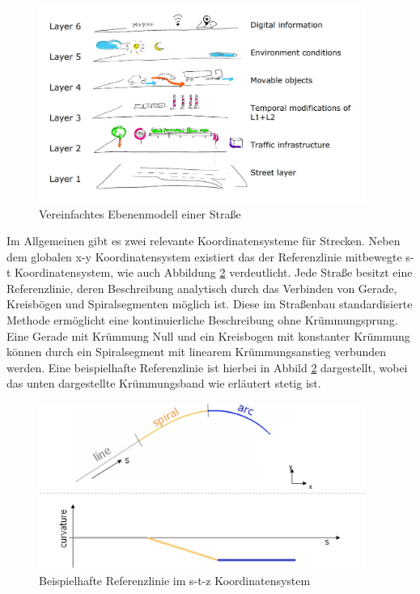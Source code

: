 \begin{figure}[H]
\flushleft
\includegraphics[width=0.95\textwidth]{fig/fig1.png}
\caption{Vereinfachtes Ebenenmodell einer Straße \cite{Eckstein.2018}}
\label{abb1}
\end{figure}

Im Allgemeinen gibt es zwei relevante Koordinatensysteme für Strecken. Neben dem globalen x-y Koordinatensystem existiert das der Referenzlinie mitbewegte s-t Koordinatensystem, wie auch Abbildung \ref{abb2} verdeutlicht. Jede Straße besitzt eine Referenzlinie, deren Beschreibung analytisch durch das Verbinden von Gerade, Kreisbögen und Spiralsegmenten möglich ist. Diese im Straßenbau standardisierte Methode ermöglicht eine kontinuierliche Beschreibung ohne Krümmungsprung. Eine Gerade mit Krümmung Null und ein Kreisbogen mit konstanter Krümmung können durch ein Spiralsegment mit linearem Krümmungsanstieg verbunden werden. Eine beispielhafte Referenzlinie ist hierbei in Abbild \ref{abb2} dargestellt, wobei das unten dargestellte Krümmungsband wie erläutert stetig ist.

\begin{figure}[H]
\flushleft
\includegraphics[width=0.95\textwidth]{fig/fig2.png}
\caption{Beispielhafte Referenzlinie im s-t-z Koordinatensystem \cite{Becker.2017}}
\label{abb2}
\end{figure}

